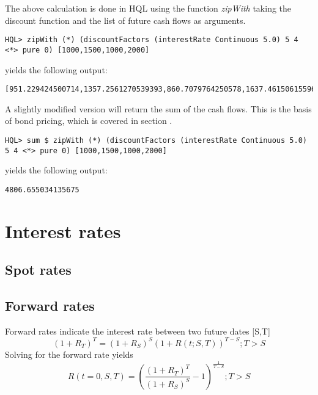 \documentclass[11pt,a4paper]{article}
\numberwithin{equation}{section}
\begin{document}
The above calculation is done in HQL using the function \textit{zipWith} taking the discount function and the list of future cash flows as arguments.
\FrameSep
\begin{lstlisting}
HQL> zipWith (*) (discountFactors (interestRate Continuous 5.0) 5 4 <*> pure 0) [1000,1500,1000,2000]
\end{lstlisting}
\FrameSep
yields the following output:
\FrameSep
\begin{lstlisting}[style=Output]
[951.229424500714,1357.2561270539393,860.7079764250578,1637.4615061559637]
\end{lstlisting}
\FrameSep
A slightly modified version will return the sum of the cash flows. This is the basis of bond pricing, which is covered in section .
\FrameSep
\begin{lstlisting}
HQL> sum $ zipWith (*) (discountFactors (interestRate Continuous 5.0) 5 4 <*> pure 0) [1000,1500,1000,2000]
\end{lstlisting}
\FrameSep
yields the following output:
\FrameSep
\begin{lstlisting}[style=Output]
4806.655034135675
\end{lstlisting}


\section{Interest rates}

\subsection{Spot rates}
\subsection{Forward rates}
Forward rates indicate the interest rate between two future dates [S,T]
\[
(1+R_T)^T=(1+R_S)^S(1+R(t;S,T))^{T-S}; T>S
\]
Solving for the forward rate yields
\[
R(t=0,S,T)=\left( \frac{(1+R_T)^T}{(1+R_S)^S} - 1 \right)^{\frac{1}{T-S}};T>S
\]
\end{document}
